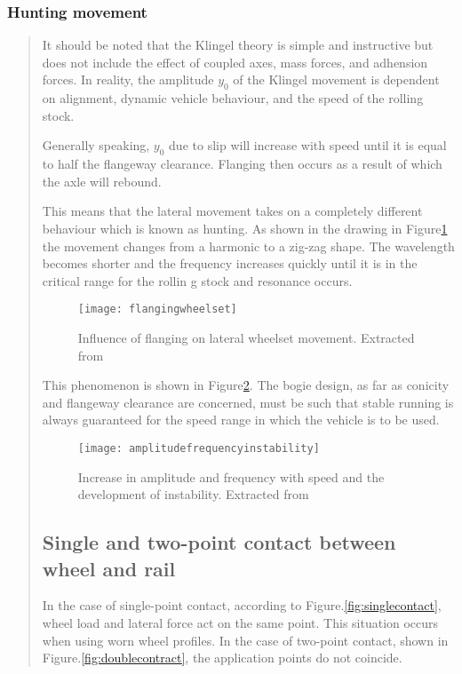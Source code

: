 \begin{appendices}
\subsubsection{Hunting movement}
\begin{quote}
It should be noted that the Klingel theory is simple and instructive but does not include the effect of coupled axes, mass forces, and adhension forces. In reality, the amplitude $y_0$ of the Klingel movement is dependent on alignment, dynamic vehicle behaviour, and the speed of the rolling stock. 

Generally speaking, $y_0$ due to slip will increase with speed until it is equal to half the flangeway clearance. Flanging then occurs as a result of which the axle will rebound. 

This means that the lateral movement takes on a completely different behaviour which is known as hunting. As shown in the drawing in Figure\ref{fig:flangingwheelset} the movement changes from a harmonic to a zig-zag shape. The wavelength becomes shorter and the frequency increases quickly until it is in the critical range for the rollin g stock and resonance occurs.

\begin{figure}[h!]
    \centering
    \texttt{[image: flangingwheelset]}
    \caption{Influence of flanging on lateral wheelset movement. Extracted from \citet[Figure 2.5]{esveld2001modern}}
    \label{fig:flangingwheelset}
\end{figure}

This phenomenon is shown in Figure\ref{fig:amplitudefrequencystability}. The bogie design, as far as conicity and flangeway clearance are concerned, must be such that stable running is always guaranteed for the speed range in which the vehicle is to be used.


\begin{figure}[h!]
    \centering
    \texttt{[image: amplitudefrequencyinstability]}
    \caption{Increase in amplitude and frequency with speed and the development of instability. Extracted from \citet[Figure 2.6]{esveld2001modern}}
    \label{fig:amplitudefrequencystability}
\end{figure}

\subsection{Single and two-point contact between wheel and rail}
In the case of single-point contact, according to Figure.\ref{fig:singlecontact}, wheel load and lateral force act on the same point. This situation occurs when using worn wheel profiles. In the case of two-point contact, shown in Figure.\ref{fig:doublecontract}, the application points do not coincide.


\end{quote}
\end{appendices}

